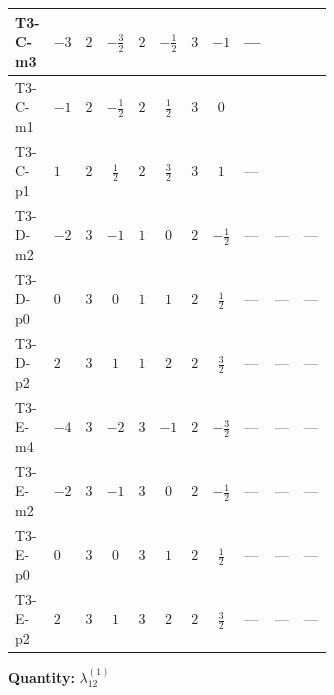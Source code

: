 \documentclass[8pt]{article}
\begin{document}
\begin{landscape}
\begin{longtable}{@{}llcccccc >{\raggedright\arraybackslash}p{0.21\linewidth} >{\raggedright\arraybackslash}p{0.21\linewidth} >{\raggedright\arraybackslash}p{0.21\linewidth}@{}}
\midrule
T3-C-m3 & $-3$ & $2$ & $-\frac{3}{2}$ & $2$ & $-\frac{1}{2}$ & $3$ & $-1$ & --- & \scriptsize\adjustbox{max width=\linewidth}{$\begin{gathered} {\lambda_{12}^{(1)}} (3 T_{\nu}^{(1)}+3 T_{\nu}^{(2)})\end{gathered}$} & \scriptsize\adjustbox{max width=\linewidth}{$\begin{gathered} -\frac{9}{2} \operatorname{Tr}\!\left({y_1}\,\left({y_1}\right)^{\dagger}\,{y_2}\,\left({y_2}\right)^{\dagger}\right)\end{gathered}$} \\
\midrule
T3-C-m1 & $-1$ & $2$ & $-\frac{1}{2}$ & $2$ & $\frac{1}{2}$ & $3$ & $0$ & \scriptsize\adjustbox{max width=\linewidth}{$\begin{gathered} +24 {\lambda_{9}} \left({\lambda_{9}}\right)^{*}\end{gathered}$} & \scriptsize\adjustbox{max width=\linewidth}{$\begin{gathered} {\lambda_{12}^{(1)}} (3 T_{\nu}^{(1)}+3 T_{\nu}^{(2)})\end{gathered}$} & \scriptsize\adjustbox{max width=\linewidth}{$\begin{gathered} -\frac{9}{2} \operatorname{Tr}\!\left({y_1}\,\left({y_1}\right)^{\dagger}\,{y_2}\,\left({y_2}\right)^{\dagger}\right)\end{gathered}$} \\
\midrule
T3-C-p1 & $1$ & $2$ & $\frac{1}{2}$ & $2$ & $\frac{3}{2}$ & $3$ & $1$ & --- & \scriptsize\adjustbox{max width=\linewidth}{$\begin{gathered} {\lambda_{12}^{(1)}} (3 T_{\nu}^{(1)}+3 T_{\nu}^{(2)})\end{gathered}$} & \scriptsize\adjustbox{max width=\linewidth}{$\begin{gathered} -\frac{9}{2} \operatorname{Tr}\!\left({y_1}\,\left({y_1}\right)^{\dagger}\,{y_2}\,\left({y_2}\right)^{\dagger}\right)\end{gathered}$} \\
\midrule
T3-D-m2 & $-2$ & $3$ & $-1$ & $1$ & $0$ & $2$ & $-\frac{1}{2}$ & --- & --- & --- \\
\midrule
T3-D-p0 & $0$ & $3$ & $0$ & $1$ & $1$ & $2$ & $\frac{1}{2}$ & --- & --- & --- \\
\midrule
T3-D-p2 & $2$ & $3$ & $1$ & $1$ & $2$ & $2$ & $\frac{3}{2}$ & --- & --- & --- \\
\midrule
T3-E-m4 & $-4$ & $3$ & $-2$ & $3$ & $-1$ & $2$ & $-\frac{3}{2}$ & --- & --- & --- \\
\midrule
T3-E-m2 & $-2$ & $3$ & $-1$ & $3$ & $0$ & $2$ & $-\frac{1}{2}$ & --- & --- & --- \\
\midrule
T3-E-p0 & $0$ & $3$ & $0$ & $3$ & $1$ & $2$ & $\frac{1}{2}$ & --- & --- & --- \\
\midrule
T3-E-p2 & $2$ & $3$ & $1$ & $3$ & $2$ & $2$ & $\frac{3}{2}$ & --- & --- & --- \\
\midrule
\bottomrule
\end{longtable}
\clearpage
\noindent\textbf{Quantity: }$\lambda_{12}^{(1)}$\par\smallskip

\end{landscape}
\end{document}
